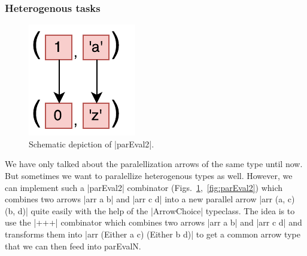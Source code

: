 \subsubsection{Heterogenous tasks}
\begin{figure}[h]
	\includegraphics[scale=0.7]{images/parEval2}
	\caption{Schematic depiction of |parEval2|.}
	\label{fig:parEval2Img}
\end{figure}
We have only talked about the paralellization arrows of the same type until now. But sometimes we want to paralellize heterogenous types as well. However, we can implement such a |parEval2| combinator (Figs.~\ref{fig:parEval2Img},~\ref{fig:parEval2}) which combines two arrows |arr a b| and |arr c d| into a new parallel arrow |arr (a, c) (b, d)| quite easily with the help of the |ArrowChoice| typeclass. The idea is to use the |+++| combinator which combines two arrows |arr a b| and |arr c d| and transforms them into |arr (Either a c) (Either b d)| to get a common arrow type that we can then feed into parEvalN.


